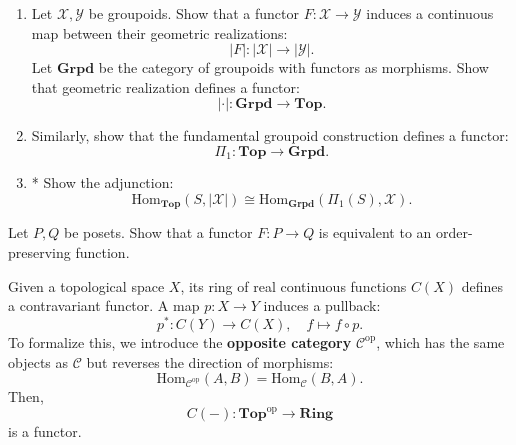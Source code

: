 \begin{exercise}
\begin{enumerate}
    \item Let $\mathcal{X}, \mathcal{Y}$ be groupoids. Show that a functor $F: \mathcal{X} \to \mathcal{Y}$ induces a continuous map between their geometric realizations:
    \[
    |F|: |\mathcal{X}| \to |\mathcal{Y}|.
    \]
    Let $\mathbf{Grpd}$ be the category of groupoids with functors as morphisms. Show that geometric realization defines a functor:
    \[
    |\cdot|: \mathbf{Grpd} \to \mathbf{Top}.
    \]
    \item Similarly, show that the fundamental groupoid construction defines a functor:
    \[
    \Pi_1: \mathbf{Top} \to \mathbf{Grpd}.
    \]
    \item* Show the adjunction:
    \[
    \mathrm{Hom}_{\mathbf{Top}}(S, |\mathcal{X}|) \cong \mathrm{Hom}_{\mathbf{Grpd}}(\Pi_1(S), \mathcal{X}).
    \]
\end{enumerate}
\end{exercise}

\begin{exercise}
Let $P, Q$ be posets. Show that a functor $F: P \to Q$ is equivalent to an order-preserving function.
\end{exercise}

\begin{example}
Given a topological space $X$, its ring of real continuous functions $C(X)$ defines a contravariant functor. A map $p: X \to Y$ induces a pullback:
\[
p^*: C(Y) \to C(X), \quad f \mapsto f \circ p.
\]
To formalize this, we introduce the \textbf{opposite category} $\mathcal{C}^{\mathrm{op}}$, which has the same objects as $\mathcal{C}$ but reverses the direction of morphisms:
\[
\mathrm{Hom}_{\mathcal{C}^{\mathrm{op}}}(A, B) = \mathrm{Hom}_{\mathcal{C}}(B, A).
\]
Then,
\[
C(-): \mathbf{Top}^{\mathrm{op}} \to \mathbf{Ring}
\]
is a functor.
\end{example}

